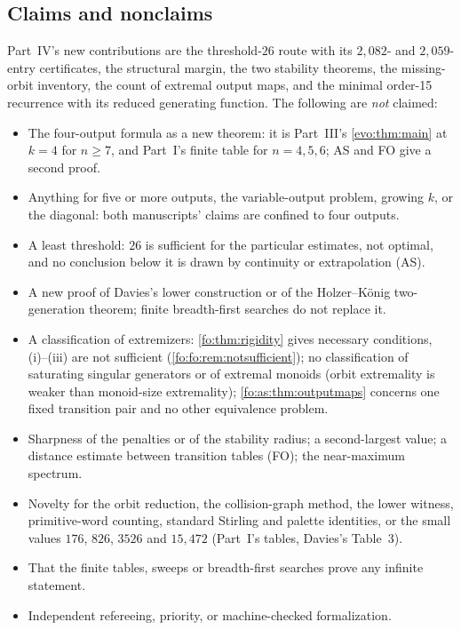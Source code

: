 \documentclass[11pt,a4paper]{article}
\numberwithin{equation}{section}
\theoremstyle{definition}
\theoremstyle{remark}
\begin{document}
\subsection{Claims and nonclaims}

Part~IV's new contributions are the threshold-$26$ route with its
$2{,}082$- and $2{,}059$-entry certificates, the structural margin, the two
stability theorems, the missing-orbit inventory, the count of extremal output
maps, and the minimal order-15 recurrence with its reduced generating function.
The following are \emph{not} claimed:
\begin{itemize}
\item The four-output formula as a new theorem: it is Part~III's
 \cref{evo:thm:main} at $k=4$ for $n\ge7$, and Part~I's finite table for
 $n=4,5,6$; AS and FO give a second proof.
\item Anything for five or more outputs, the variable-output problem, growing
 $k$, or the diagonal: both manuscripts' claims are confined to four outputs.
\item A least threshold: $26$ is sufficient for the particular estimates, not
 optimal, and no conclusion below it is drawn by continuity or extrapolation
 (AS).
\item A new proof of Davies's lower construction or of the Holzer--K\"onig
 two-generation theorem; finite breadth-first searches do not replace it.
\item A classification of extremizers: \cref{fo:thm:rigidity} gives necessary
 conditions, (i)--(iii) are not sufficient
 (\cref{fo:fo:rem:notsufficient}); no classification of saturating singular
 generators or of extremal monoids (orbit extremality is weaker than
 monoid-size extremality); \cref{fo:as:thm:outputmaps} concerns one fixed
 transition pair and no other equivalence problem.
\item Sharpness of the penalties or of the stability radius; a second-largest
 value; a distance estimate between transition tables (FO); the near-maximum
 spectrum.
\item Novelty for the orbit reduction, the collision-graph method, the lower
 witness, primitive-word counting, standard Stirling and palette identities,
 or the small values $176$, $826$, $3526$ and $15{,}472$ (Part~I's tables,
 Davies's Table~3).
\item That the finite tables, sweeps or breadth-first searches prove any
 infinite statement.
\item Independent refereeing, priority, or machine-checked formalization.
\end{itemize}
\end{document}
